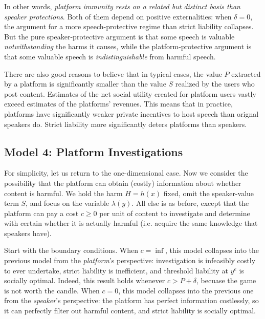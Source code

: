 In other words, \emph{platform immunity rests on a related but distinct basis than speaker protections}. Both of them depend on positive externalities: when $\delta = 0$, the argument for a more speech-protective regime than strict liability collapses. But the pure speaker-protective argument is that some speech is valuable \emph{notwithstanding} the harms it causes, while the platform-protective argument is that some valuable speech is \emph{indistinguishable} from harmful speech.

There are also good reasons to believe that in typical cases, the value $P$ extracted by a platform is significantly smaller than the value $S$ realized by the users who post content. Estimates of the net social utility created for platform users vastly exceed estimates of the platforms' revenues. This means that in practice, platforms have significantly weaker private incentives to host speech than orignal speakers do. Strict liability more significantly deters platforms than speakers.

\subsection{Model 4: Platform Investigations}

For simplicity, let us return to the one-dimensional case. Now we consider the possibility that the platform can obtain (costly) information about whether content is harmful. We hold the harm $H = h(x)$ fixed, omit the speaker-value term $S$, and focus on the variable $\lambda(y)$. All else is as before, except that the platform can pay a cost $c \ge 0$ per unit of content to investigate and determine with certain whether it is actually harmful (i.e. acquire the same knowledge that speakers have).

Start with the boundary conditions. When $c = \inf$, this model collapses into the previous model from the \emph{platform}'s perspective: investigation is infeasibly costly to ever undertake, strict liability is inefficient, and threshold liability at $y^e$ is socially optimal. Indeed, this result holds whenever $c > P + \delta$, becuase the game is not worth the candle. When $c=0$, this model collapses into the previous one from the \emph{speaker}'s perspective: the platform has perfect information costlessly, so it can perfectly filter out harmful content, and strict liability is socially optimal.

